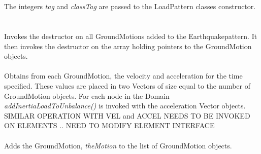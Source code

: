  \\ 
\\ 
The integers {\em tag} and {\em classTag} are passed to the
LoadPattern classes constructor. \\

 \\
\\ 
Invokes the destructor on all GroundMotions added to the
Earthquakepattern. It then invokes the destructor on the array holding
pointers to the GroundMotion objects.\\

 \\ 
Obtains from each GroundMotion, the velocity and acceleration for the
time specified. These values are placed in two Vectors of size equal
to the number of GroundMotion objects. For each node in the Domain
{\em addInertiaLoadToUnbalance()} is invoked with the acceleration Vector
objects. SIMILAR OPERATION WITH VEL and ACCEL NEEDS TO BE INVOKED ON
ELEMENTS .. NEED TO MODIFY ELEMENT INTERFACE \\

 \\
Adds the GroundMotion, {\em theMotion} to the list of GroundMotion
objects. \\